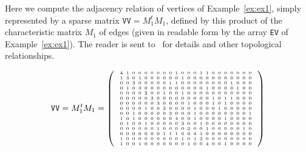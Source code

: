 \begin{example} %

Here we compute the adjacency relation of vertices of Example~\ref{ex:ex1}, simply represented by a sparse matrix $\texttt{VV}=M_1^t M_1$, defined by this product of the characteristic matrix $M_1$ of edges (given in readable form by the array \texttt{EV} of Example~\ref{ex:ex1}). The reader is sent to~\cite{Dicarlo:2014:TNL:2543138.2543294} for details and other topological relationships.

\[
\texttt{VV}=M_1^t M_1 = \mat{
{\tiny\arraycolsep=1.9pt%
\begin{array}
{cccccccccccccccccccccc}
4 & 1 & 0 & 0 & 0 & 0 & 0 & 0 & 0 & 1 & 0 & 0 & 0 & 1 & 1 & 0 & 0 & 0 & 0 & 0 & 0 & 0\\
1 & 3 & 0 & 1 & 0 & 0 & 0 & 0 & 0 & 0 & 1 & 0 & 0 & 0 & 0 & 0 & 0 & 0 & 0 & 0 & 0 & 0\\
0 & 0 & 3 & 0 & 0 & 0 & 0 & 0 & 1 & 1 & 0 & 0 & 0 & 0 & 0 & 0 & 0 & 0 & 1 & 0 & 0 & 0\\
0 & 1 & 0 & 3 & 0 & 0 & 0 & 0 & 0 & 0 & 0 & 0 & 0 & 0 & 1 & 0 & 0 & 0 & 0 & 1 & 0 & 0\\
0 & 0 & 0 & 0 & 2 & 0 & 0 & 1 & 0 & 0 & 1 & 0 & 0 & 0 & 0 & 0 & 0 & 0 & 0 & 0 & 0 & 0\\
0 & 0 & 0 & 0 & 0 & 3 & 0 & 0 & 0 & 0 & 0 & 0 & 0 & 0 & 0 & 1 & 0 & 1 & 1 & 0 & 0 & 0\\
0 & 0 & 0 & 0 & 0 & 0 & 3 & 0 & 0 & 0 & 0 & 1 & 0 & 0 & 0 & 1 & 0 & 1 & 0 & 0 & 0 & 0\\
0 & 0 & 0 & 0 & 1 & 0 & 0 & 3 & 0 & 0 & 0 & 0 & 1 & 0 & 0 & 0 & 1 & 0 & 0 & 0 & 0 & 0\\
0 & 0 & 1 & 0 & 0 & 0 & 0 & 0 & 3 & 0 & 0 & 0 & 1 & 0 & 0 & 0 & 0 & 0 & 0 & 0 & 0 & 1\\
1 & 0 & 1 & 0 & 0 & 0 & 0 & 0 & 0 & 4 & 0 & 0 & 1 & 0 & 0 & 0 & 0 & 1 & 0 & 0 & 0 & 0\\
0 & 1 & 0 & 0 & 1 & 0 & 0 & 0 & 0 & 0 & 3 & 0 & 0 & 1 & 0 & 0 & 0 & 0 & 0 & 0 & 0 & 0\\
0 & 0 & 0 & 0 & 0 & 0 & 1 & 0 & 0 & 0 & 0 & 3 & 0 & 0 & 1 & 0 & 0 & 0 & 0 & 0 & 1 & 0\\
0 & 0 & 0 & 0 & 0 & 0 & 0 & 1 & 1 & 1 & 0 & 0 & 4 & 1 & 0 & 0 & 0 & 0 & 0 & 0 & 0 & 0\\
1 & 0 & 0 & 0 & 0 & 0 & 0 & 0 & 0 & 0 & 1 & 0 & 1 & 3 & 0 & 0 & 0 & 0 & 0 & 0 & 0 & 0\\
1 & 0 & 0 & 1 & 0 & 0 & 0 & 0 & 0 & 0 & 0 & 1 & 0 & 0 & 4 & 0 & 0 & 1 & 0 & 0 & 0 & 0\\

\end{array}}}\]
\end{example}
